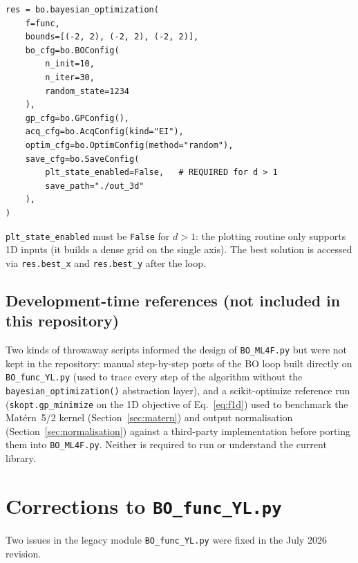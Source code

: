 \documentclass[11pt,a4paper]{article}
\theoremstyle{remark}
\newcommand{\codefile}[1]{\texttt{#1}}
\newcommand{\codefn}[1]{\texttt{#1()}}
\begin{document}
\begin{lstlisting}[numbers=none, caption=\codefile{3D\_Test\_CASE.py} --- key call]
res = bo.bayesian_optimization(
    f=func,
    bounds=[(-2, 2), (-2, 2), (-2, 2)],
    bo_cfg=bo.BOConfig(
        n_init=10,
        n_iter=30,
        random_state=1234
    ),
    gp_cfg=bo.GPConfig(),
    acq_cfg=bo.AcqConfig(kind="EI"),
    optim_cfg=bo.OptimConfig(method="random"),
    save_cfg=bo.SaveConfig(
        plt_state_enabled=False,   # REQUIRED for d > 1
        save_path="./out_3d"
    ),
)
\end{lstlisting}

\texttt{plt\_state\_enabled} must be \texttt{False} for $d>1$: the plotting
routine only supports 1D inputs (it builds a dense grid on the single axis).
The best solution is accessed via \texttt{res.best\_x} and
\texttt{res.best\_y} after the loop.

\subsection{Development-time references (not included in this repository)}
\label{sec:exyl}

Two kinds of throwaway scripts informed the design of \codefile{BO\_ML4F.py}
but were not kept in the repository: manual step-by-step ports of the BO
loop built directly on \codefile{BO\_func\_YL.py} (used to trace every step
of the algorithm without the \codefn{bayesian\_optimization} abstraction
layer), and a scikit-optimize reference run (\texttt{skopt.gp\_minimize} on
the 1D objective of Eq.~\eqref{eq:f1d}) used to benchmark the Mat\'{e}rn~5/2
kernel (Section~\ref{sec:matern}) and output normalisation
(Section~\ref{sec:normalisation}) against a third-party implementation
before porting them into \codefile{BO\_ML4F.py}. Neither is required to run
or understand the current library.

\section{Corrections to \texttt{BO\_func\_YL.py}}
\label{sec:funcyl}

Two issues in the legacy module \codefile{BO\_func\_YL.py} were fixed in the
July 2026 revision.
\end{document}
